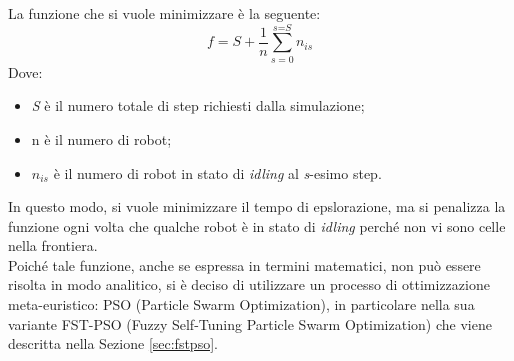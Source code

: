 La funzione che si vuole minimizzare è la seguente:
\begin{equation}
\label{math:pso}
\textit{f} = \textit{S} + \frac{1}{n}\sum_{\textit{s} = 0}^{\textit{s} = \textit{S}}n_{\textit{is}}
\end{equation}
Dove:
\begin{itemize}
	\item \textit{S} è il numero totale di step richiesti dalla simulazione;
	\item n è il numero di robot;
	\item $n_{\textit{is}}$ è il numero di robot in stato di \textit{idling} al \textit{s}-esimo step.
\end{itemize}
In questo modo, si vuole minimizzare il tempo di epslorazione, ma si penalizza la funzione ogni volta che qualche robot è in stato di \textit{idling} perché non vi sono celle nella frontiera.\\
Poiché tale funzione, anche se espressa in termini matematici, non può essere risolta in modo analitico, si è deciso di utilizzare un processo di ottimizzazione meta-euristico: PSO (Particle Swarm Optimization), in particolare nella sua variante FST-PSO (Fuzzy Self-Tuning Particle Swarm Optimization) \cite{nobile2018} che viene descritta nella Sezione \ref{sec:fstpso}.

